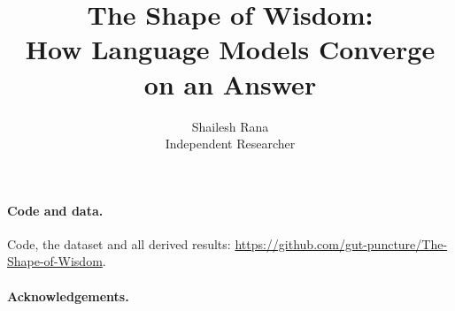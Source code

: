 \documentclass[10pt,twocolumn]{article}
\title{\vspace{-1.0em}\textbf{The Shape of Wisdom:\\How Language Models Converge on an Answer}}
\author{Shailesh Rana\\Independent Researcher}
\date{}
\begin{document}
\twocolumn[
\begin{@twocolumnfalse}
\maketitle
\vspace{-1.4em}
\begin{center}
\begin{minipage}{0.82\textwidth}
\begin{abstract}

\end{abstract}
\end{minipage}
\end{center}
\vspace{0.7em}
\end{@twocolumnfalse}
]








\paragraph{Code and data.} Code, the dataset and all derived results: \url{https://github.com/gut-puncture/The-Shape-of-Wisdom}.

\paragraph{Acknowledgements.} 

\small



\small
\appendix

\end{document}
